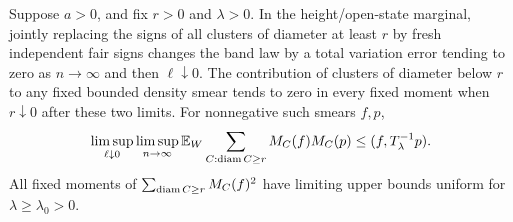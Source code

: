 \begin{lemma}\label{an:resampling}
Suppose $a>0$, and fix $r>0$ and $\lambda>0$.  In the height/open-state
marginal, jointly replacing the signs of all
clusters of diameter at least $r$ by fresh independent fair signs
changes the band law by a total variation error tending to zero as
$n\to\infty$ and then $\ell\downarrow0$.  The contribution of
clusters of diameter below $r$ to any fixed bounded density smear
tends to zero in every fixed moment when $r\downarrow0$ after
these two limits.  For nonnegative such smears $f,p$,
\begin{equation}
 \limsup_{\ell\downarrow0}\limsup_{n\to\infty}
 \mathbb E_W\sum_{C:\operatorname{diam} C\ge r}M_C(f)M_C(p)
      \le (f,T_\lambda^{-1}p).
 \label{an:cross-cluster}
\end{equation}
All fixed moments of $\sum_{\operatorname{diam} C\ge r}M_C(f)^2$ have limiting
upper bounds uniform for $\lambda\ge\lambda_0>0$.
\end{lemma}

